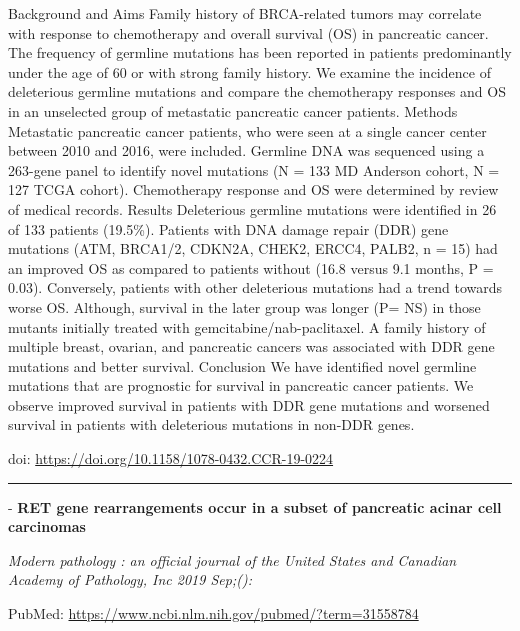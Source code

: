 \documentclass[
]{article}
\renewcommand{\linethickness}{0.05em}
\begin{document}
Background and Aims Family history of BRCA-related tumors may correlate
with response to chemotherapy and overall survival (OS) in pancreatic
cancer. The frequency of germline mutations has been reported in
patients predominantly under the age of 60 or with strong family
history. We examine the incidence of deleterious germline mutations and
compare the chemotherapy responses and OS in an unselected group of
metastatic pancreatic cancer patients. Methods Metastatic pancreatic
cancer patients, who were seen at a single cancer center between 2010
and 2016, were included. Germline DNA was sequenced using a 263-gene
panel to identify novel mutations (N = 133 MD Anderson cohort, N = 127
TCGA cohort). Chemotherapy response and OS were determined by review of
medical records. Results Deleterious germline mutations were identified
in 26 of 133 patients (19.5\%). Patients with DNA damage repair (DDR)
gene mutations (ATM, BRCA1/2, CDKN2A, CHEK2, ERCC4, PALB2, n = 15) had
an improved OS as compared to patients without (16.8 versus 9.1 months,
P = 0.03). Conversely, patients with other deleterious mutations had a
trend towards worse OS. Although, survival in the later group was longer
(P= NS) in those mutants initially treated with
gemcitabine/nab-paclitaxel. A family history of multiple breast,
ovarian, and pancreatic cancers was associated with DDR gene mutations
and better survival. Conclusion We have identified novel germline
mutations that are prognostic for survival in pancreatic cancer
patients. We observe improved survival in patients with DDR gene
mutations and worsened survival in patients with deleterious mutations
in non-DDR genes.

doi: \url{https://doi.org/10.1158/1078-0432.CCR-19-0224}

\begin{center}\rule{0.5\linewidth}{\linethickness}\end{center}

- \textbf{RET gene rearrangements occur in a subset of pancreatic acinar
cell carcinomas}

\emph{Modern pathology : an official journal of the United States and
Canadian Academy of Pathology, Inc 2019 Sep;():}

PubMed: \url{https://www.ncbi.nlm.nih.gov/pubmed/?term=31558784}
\end{document}

